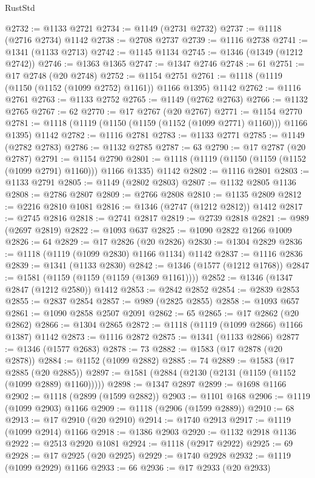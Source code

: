\begin{lexlean}{RustStd}
\begin{coremodule}
@2732 := @1133 @2721
@2734 := @1149 (@2731 @2732)
@2737 := @1118 (@2716 @2734) @1142
@2738 := @2708 @2737
@2739 := @1116 @2738
@2741 := @1341 (@1133 @2713)
@2742 := @1145 @1134
@2745 := @1346 (@1349 (@1212 @2742))
@2746 := @1363 @1365
@2747 := @1347 @2746
@2748 := 61
@2751 := @17 @2748 (@20 @2748)
@2752 := @1154 @2751
@2761 := @1118 (@1119 (@1150 (@1152 (@1099 @2752) @1161)) @1166 @1395) @1142
@2762 := @1116 @2761
@2763 := @1133 @2752
@2765 := @1149 (@2762 @2763)
@2766 := @1132 @2765
@2767 := 62
@2770 := @17 @2767 (@20 @2767)
@2771 := @1154 @2770
@2781 := @1118 (@1119 (@1150 (@1159 (@1152 (@1099 @2771) @1160))) @1166 @1395) @1142
@2782 := @1116 @2781
@2783 := @1133 @2771
@2785 := @1149 (@2782 @2783)
@2786 := @1132 @2785
@2787 := 63
@2790 := @17 @2787 (@20 @2787)
@2791 := @1154 @2790
@2801 := @1118 (@1119 (@1150 (@1159 (@1152 (@1099 @2791) @1160))) @1166 @1335) @1142
@2802 := @1116 @2801
@2803 := @1133 @2791
@2805 := @1149 (@2802 @2803)
@2807 := @1132 @2805 @1136
@2808 := @2786 @2807
@2809 := @2766 @2808
@2810 := @1135 @2809
@2812 := @2216 @2810 @1081
@2816 := @1346 (@2747 (@1212 @2812)) @1412
@2817 := @2745 @2816
@2818 := @2741 @2817
@2819 := @2739 @2818
@2821 := @989 (@2697 @2819)
@2822 := @1093 @637
@2825 := @1090 @2822 @1266 @1009
@2826 := 64
@2829 := @17 @2826 (@20 @2826)
@2830 := @1304 @2829
@2836 := @1118 (@1119 (@1099 @2830) @1166 @1134) @1142
@2837 := @1116 @2836
@2839 := @1341 (@1133 @2830)
@2842 := @1346 (@1577 (@1212 @1768))
@2847 := @1581 (@1159 (@1159 (@1159 (@1369 @1161))))
@2852 := @1346 (@1347 @2847 (@1212 @2580)) @1412
@2853 := @2842 @2852
@2854 := @2839 @2853
@2855 := @2837 @2854
@2857 := @989 (@2825 @2855)
@2858 := @1093 @657
@2861 := @1090 @2858 @2507 @2091
@2862 := 65
@2865 := @17 @2862 (@20 @2862)
@2866 := @1304 @2865
@2872 := @1118 (@1119 (@1099 @2866) @1166 @1387) @1142
@2873 := @1116 @2872
@2875 := @1341 (@1133 @2866)
@2877 := @1346 (@1577 @2683)
@2878 := 73
@2882 := @1583 (@17 @2878 (@20 @2878))
@2884 := @1152 (@1099 @2882)
@2885 := 74
@2889 := @1583 (@17 @2885 (@20 @2885))
@2897 := @1581 (@2884 (@2130 (@2131 (@1159 (@1152 (@1099 @2889) @1160)))))
@2898 := @1347 @2897
@2899 := @1698 @1166
@2902 := @1118 (@2899 (@1599 @2882))
@2903 := @1101 @168
@2906 := @1119 (@1099 @2903) @1166
@2909 := @1118 (@2906 (@1599 @2889))
@2910 := 68
@2913 := @17 @2910 (@20 @2910)
@2914 := @1740 @2913
@2917 := @1119 (@1099 @2914) @1166
@2918 := @1386 @2903
@2920 := @1132 @2918 @1136
@2922 := @2513 @2920 @1081
@2924 := @1118 (@2917 @2922)
@2925 := 69
@2928 := @17 @2925 (@20 @2925)
@2929 := @1740 @2928
@2932 := @1119 (@1099 @2929) @1166
@2933 := 66
@2936 := @17 @2933 (@20 @2933)

\end{coremodule}
\end{lexlean}

